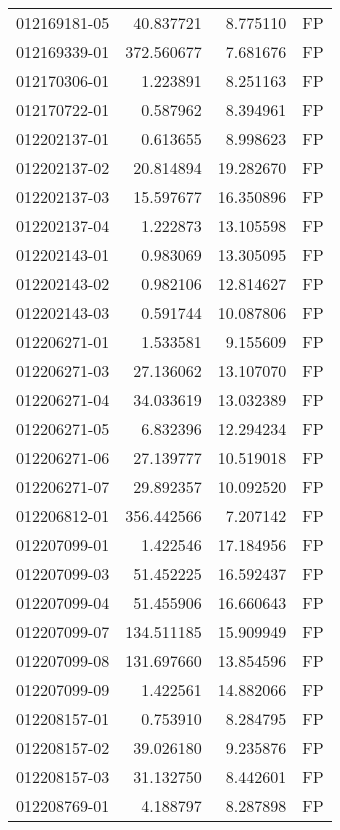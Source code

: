 \begin{tabular}{lrrl}
012169181-05 &   40.837721 &       8.775110 &   FP \\
012169339-01 &  372.560677 &       7.681676 &   FP \\
012170306-01 &    1.223891 &       8.251163 &   FP \\
012170722-01 &    0.587962 &       8.394961 &   FP \\
012202137-01 &    0.613655 &       8.998623 &   FP \\
012202137-02 &   20.814894 &      19.282670 &   FP \\
012202137-03 &   15.597677 &      16.350896 &   FP \\
012202137-04 &    1.222873 &      13.105598 &   FP \\
012202143-01 &    0.983069 &      13.305095 &   FP \\
012202143-02 &    0.982106 &      12.814627 &   FP \\
012202143-03 &    0.591744 &      10.087806 &   FP \\
012206271-01 &    1.533581 &       9.155609 &   FP \\
012206271-03 &   27.136062 &      13.107070 &   FP \\
012206271-04 &   34.033619 &      13.032389 &   FP \\
012206271-05 &    6.832396 &      12.294234 &   FP \\
012206271-06 &   27.139777 &      10.519018 &   FP \\
012206271-07 &   29.892357 &      10.092520 &   FP \\
012206812-01 &  356.442566 &       7.207142 &   FP \\
012207099-01 &    1.422546 &      17.184956 &   FP \\
012207099-03 &   51.452225 &      16.592437 &   FP \\
012207099-04 &   51.455906 &      16.660643 &   FP \\
012207099-07 &  134.511185 &      15.909949 &   FP \\
012207099-08 &  131.697660 &      13.854596 &   FP \\
012207099-09 &    1.422561 &      14.882066 &   FP \\
012208157-01 &    0.753910 &       8.284795 &   FP \\
012208157-02 &   39.026180 &       9.235876 &   FP \\
012208157-03 &   31.132750 &       8.442601 &   FP \\
012208769-01 &    4.188797 &       8.287898 &   FP \\

\end{tabular}
